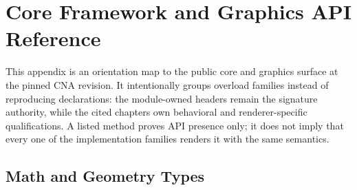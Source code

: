 \chapter{Core Framework and Graphics API Reference}
\label{ch:api-quick-reference}

This appendix is an orientation map to the public core and graphics surface at the pinned CNA
revision.  It intentionally groups overload families instead of reproducing declarations: the
module-owned headers remain the signature authority, while the cited chapters own behavioral and
renderer-specific qualifications.  A listed method proves API presence only; it does not imply
that every one of the \RendererFamilyCount{} implementation families renders it with the same semantics.

\section{Math and Geometry Types}
\label{sec:api-math}

